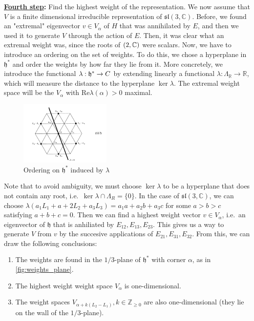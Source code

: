 \documentclass{report}
\begin{document}
{\bf \underline{Fourth step}:} Find the highest weight of the representation.
We now assume that $V$ is a finite dimensional irreducible representation of $\mathfrak{sl}(3, \mathbb C)$.
Before, we found an "extremal" eigenvector $v \in V_\alpha$ of $H$ that was annihilated by $E$, and then we used it to generate $V$ through the action of $E$.
Then, it was clear what an extremal weight was, since the roots of $\sl(2,\mathbb C)$ were scalars.
Now, we have to introduce an ordering on the set of weights.
To do this, we chose a hyperplane in $\mathfrak h^*$ and order the weights by how far they lie from it.
More concretely, we introduce the functional $\lambda: \mathfrak h^* \to \mathbb \mathbb C$ by extending linearly a functional $\lambda: \Lambda_\mathbb R \to \mathbb R$, which will measure the distance to the hyperplane $\ker \lambda$.
The extremal weight space will be the $V_\alpha$ with $\mathrm{Re}\lambda(\alpha)>0$ maximal.
\begin{figure}[h]
    \centering
    \includegraphics[width=0.4\textwidth]{sl_3_C_roots_ordering.png}
    \caption{Ordering on $\mathfrak h^*$ induced by $\lambda$}
    \label{fig:roots_ordering}
\end{figure}
Note that to avoid ambiguity, we must choose $\ker \lambda$ to be a hyperplane that does not contain any root, i.e.\ $\ker \lambda \cap \Lambda_R = \{0\}$.
In the case of $\mathfrak{sl}(3, \mathbb C)$, we can choose 
$\lambda(a_1L_1 + a+2 L_2 + a_3 L_3) = a_1a + a_2b + a_3c$
for some $a > b > c$ satisfying $a + b + c = 0$.
Then we can find a highest weight vector $v \in V_\alpha$, i.e.\ an eigenvector of $\mathfrak h$ that is anhiliated by $E_{12}, E_{13}, E_{23}$.
This gives us a way to generate $V$ from $v$ by the succesive applications of $E_{21}, E_{31}, E_{32}$.
From this, we can draw the following conclusions:
\begin{enumerate}[label = (\roman*)]
    \item The weights are found in the $1/3$-plane of $\mathfrak h^*$ with corner $\alpha$, as in \cref{fig:weights_plane}.
    \item The highest weight weight space $V_\alpha$ is one-dimensional.
    \item The weight spaces $V_{\alpha + k(L_2 - L_1)}, k \in \mathbb Z_{\geq 0}$ are also one-dimensional (they lie on the wall of the $1/3$-plane).
\end{enumerate}
\end{document}
